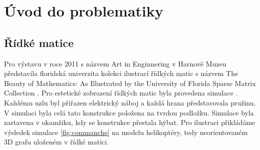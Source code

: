\chapter{Úvod do problematiky}

\section{Řídké matice}


Pro výstavu v roce 2011 s názvem Art in Enginnering v Harnově Muzeu představila floridská univerzita kolekci ilustrací řídkých matic s názvem The Beauty of Mathematics: As Illustrated by the University of Florida Sparse Matrix Collection \cite{Davis:2011:UFS:2049662.2049663}. Pro estetické zobrazení řídkých matic byla provedena simulace \cite{simul}. Každému uzlu byl přiřazen elektrický náboj a každá hrana představovala pružinu. V simulaci byla celá tato konstrukce položena na tvrdou podložku. Simulace byla zastavena v okamžiku, kdy se konstrukce přestala hýbat. Pro ilustraci přikládáme výsledek simulace \ref{fig:commanche} na modelu helikoptéry, tedy neorientovaném 3D grafu uloženém v řídké matici.

